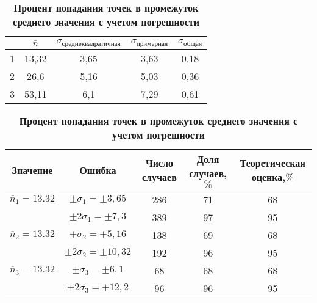 \documentclass[a4paper, 10pt]{article}%
\begin{document}
\begin{table}
\caption{\textbf{Ошибки и средние значения}}
\begin{tabular}{|c|c|c|c|c|}
\hline
&$\overline{n}$&$\sigma_{\text{среднеквадратичная}}$&$\sigma_{\text{примерная}}$&$\sigma_{\text{общая}}$\\
\hline
1&13,32&3,65&3,63&0,18\\
\hline
2&26,6&5,16&5,03&0,36\\
\hline
3&53,11&6,1&7,29&0,61\\
\hline
\end{tabular}
\caption{\textbf{Процент попадания точек в промежуток среднего значения с учетом погрешности}}
\begin{tabular}{|c|c|c|c|c|}
\hline
Значение&Ошибка&Число случаев&Доля случаев,$\%$&Теоретическая оценка,$\%$ \\
\hline
$\overline{n}_1 = 13.32$ & $\pm \sigma_1 = \pm 3,65$ & 286 & 71 & 68 \\
& $\pm 2 \sigma_1 = \pm 7,3$ & 389 & 97 & 95 \\
\hline
$\overline{n}_2 = 13.32$ & $\pm  \sigma_2 = \pm 5,16$ & 138 & 69 & 68 \\
& $\pm 2 \sigma_2 = \pm 10,32$ & 192 & 96 & 95 \\
\hline
$\overline{n}_3 = 13.32$ & $\pm  \sigma_3 = \pm 6,1$ & 68 & 68 & 68 \\
& $\pm 2 \sigma_3 = \pm 12,2$ & 96 & 96 & 95 \\
\hline
\end{tabular}
\end{table}
\end{document}
